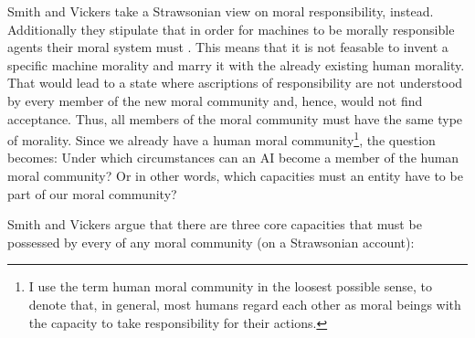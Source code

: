\documentclass{article}
\begin{document}



Smith and Vickers take a Strawsonian view on moral responsibility, instead.
Additionally they stipulate that in order for machines to be morally responsible
agents their moral system must . This means that it is not feasable to invent a specific machine morality
and marry it with the already existing human morality. That would lead to a
state where ascriptions of responsibility are not understood by every member of
the new moral community and, hence, would not find acceptance. Thus, all members
of the moral community must have the same type of morality. Since we already
have a human moral community\footnote{I use the term human moral community in
	the loosest possible sense, to denote that, in general, most humans
	regard each other as moral beings with the capacity to take
responsibility for their actions.}, the question becomes: Under which
circumstances can an AI become a member of the human moral community? Or in
other words, which capacities must an entity have to be part of our moral
community?



%
%
Smith and Vickers argue that there are three core capacities that must be
possessed by every  of any moral community (on a Strawsonian
account):
\end{document}
